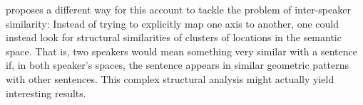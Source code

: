 \documentclass[11pt, a4paper]{scrartcl}
\begin{document}
\textcite{10.2307/2564566} proposes a different way for this account to tackle the problem of inter-speaker similarity: Instead of trying to explicitly map one axis to another, one could instead look for structural similarities of clusters of locations in the semantic space. That is, two speakers would mean something very similar with a sentence if, in both speaker's spaces, the sentence appears in similar geometric patterns with other sentences. This complex structural analysis might actually yield interesting results.


\begin{singlespacing}
\printbibliography{}
\end{singlespacing}
\end{document}
